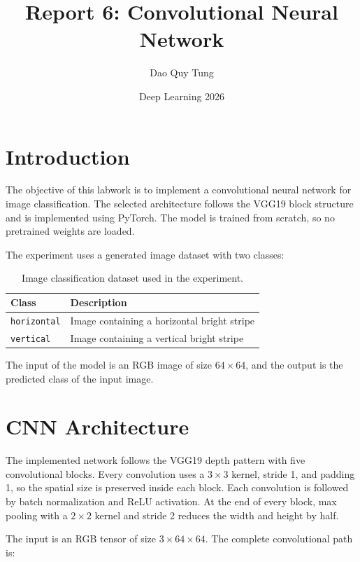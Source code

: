 \documentclass[12pt,a4paper]{article}
\title{Report 6: Convolutional Neural Network}
\author{Dao Quy Tung}
\date{Deep Learning 2026}
\begin{document}
\maketitle

\section{Introduction}

The objective of this labwork is to implement a convolutional neural network for image classification.
The selected architecture follows the VGG19 block structure and is implemented using PyTorch.
The model is trained from scratch, so no pretrained weights are loaded.

The experiment uses a generated image dataset with two classes:

\begin{table}[H]
\centering
\begin{tabular}{ll}
\toprule
Class & Description \\
\midrule
\texttt{horizontal} & Image containing a horizontal bright stripe \\
\texttt{vertical} & Image containing a vertical bright stripe \\
\bottomrule
\end{tabular}
\caption{Image classification dataset used in the experiment.}
\end{table}

The input of the model is an RGB image of size \(64 \times 64\), and the output is the predicted class of the input image.

\section{CNN Architecture}

The implemented network follows the VGG19 depth pattern with five convolutional blocks.
Every convolution uses a \(3 \times 3\) kernel, stride 1, and padding 1, so the spatial size is preserved inside each block.
Each convolution is followed by batch normalization and ReLU activation.
At the end of every block, max pooling with a \(2 \times 2\) kernel and stride 2 reduces the width and height by half.

The input is an RGB tensor of size \(3 \times 64 \times 64\).
The complete convolutional path is:
\end{document}
